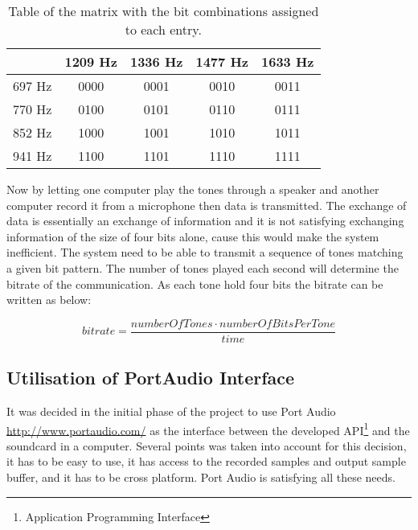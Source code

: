 	\begin{table}[htb]
		\begin{center}
			\begin{tabular}{c|c c c c}
			 & 1209 Hz & 1336 Hz & 1477 Hz & 1633 Hz \\
			\hline
			697 Hz & 0000 & 0001 & 0010 & 0011 \\
			770 Hz & 0100 & 0101 & 0110 & 0111 \\
			852 Hz & 1000 & 1001 & 1010 & 1011 \\
			941 Hz & 1100 & 1101 & 1110 & 1111 \\
			\end{tabular}
		\end{center}
		\caption{Table of the matrix with the bit combinations assigned to each entry.}
		\label{tab:DTMF_mapping}
	\end{table}
	
	Now by letting one computer play the tones through a speaker and another computer record it from
	a microphone then data is transmitted. The exchange of data is essentially an exchange
	of information and it is not satisfying exchanging information of the size of four bits alone,
	cause this would make the system inefficient. The system need to be able to transmit a sequence
	of tones matching a given bit pattern. The number of tones played each second will determine the
	bitrate of the communication. As each tone hold four bits the bitrate can be written as below:
	\begin{center}\begin{equation}bitrate = \frac{numberOfTones \cdot numberOfBitsPerTone}{time}\end{equation}\end{center}
	
	\subsection{Utilisation of PortAudio Interface}
	It was decided in the initial phase of the project to use Port Audio \url{http://www.portaudio.com/}
	as the interface between the developed API\footnote{Application Programming Interface} and the 
	soundcard in a computer. Several points was taken into account for this decision, it has to be easy to use,
	it has access to the recorded samples and output sample buffer, and it has to be cross platform.
	Port Audio is satisfying all these needs.
	
